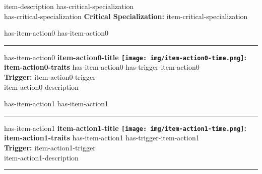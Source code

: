 \documentclass{article}
\begin{document}
        item-description
        has-critical-specialization \\
        has-critical-specialization \textbf{Critical Specialization:} item-critical-specialization

        
        has-item-action0 \vspace{1.25mm}
        has-item-action0 \rule{\textwidth}{0.5pt}
        has-item-action0 \textbf{item-action0-title \texttt{[image: img/item-action0-time.png]}: item-action0-traits}  
        has-item-action0 has-trigger-item-action0 \\ \textbf{Trigger:} item-action0-trigger\\
        item-action0-description

        has-item-action1 \vspace{1.25mm}
        has-item-action1 \rule{\textwidth}{0.5pt}
        has-item-action1 \textbf{item-action1-title \texttt{[image: img/item-action1-time.png]}: item-action1-traits}  
        has-item-action1 has-trigger-item-action1 \\ \textbf{Trigger:} item-action1-trigger\\
        item-action1-description
        
        \vspace{1.5mm}
        \rule{\textwidth}{0.5pt}

    \endgroup
\end{document}
